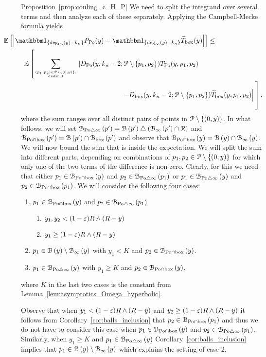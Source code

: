 \begin{proofof}{Proposition~\ref{prop:couling_c_H_P}}
We need to split the integrand over several terms and then analyze each of these separately. Applying the Campbell-Mecke formula yields
\begin{align*} 
 &\hspace{-30pt}\Exp{ \left| \ind{\mathrm{deg}_{\Po}(y) = k_n} P_{\Po}(y)
        - \ind{\mathrm{deg}_{\infty}(y) = k_n}  \widetilde{T}_{\mathrm{box}}(y)
        \right|}\leq \\
 & {\mathbb E} \left[ \sum_{(p_1,p_2) \in \Pcal \setminus \{(0,y)\}, \atop \text{distinct}}
  \left| D_{\Po}(y,k_n-2; \Pcal \setminus \{p_1,p_2 \}) T_{\Po}(y,p_1,p_2) \right. \right.\\
  & \hspace{5cm} 
\left. \left. - D_{\text{box}} (y,k_n-2;\Pcal \setminus \{p_1,p_2\}) \widetilde{T}_{\text{box}}(y,p_1,p_2)
   \right| \vphantom{\sum_{p_1,p_2 \in \Pcal \setminus \{(0,y)\}, \atop \text{distinct}}}\right],
\end{align*}
where the sum ranges over all distinct pairs of points in ${\mathcal P} \setminus \{ (0,y)\}$. In what follows, we will set ${\mathcal B}_{{\mathrm{Po}} \bigtriangleup \infty}\left(p'\right) = {\mathcal B}\left(p'\right) \bigtriangleup ({\mathcal B}_{\infty}\left(p'\right) \cap {\mathcal R})$ and ${\mathcal B}_{{\mathrm{Po}} \cap \text{box}}\left(p'\right) ={\mathcal B}\left(p'\right) \cap {\mathcal B}_{\text{box}}\left(p'\right)$ and observe that ${\mathcal B}_{{\mathrm{Po}} \cap \text{box}}\left(y\right) = {\mathcal B}\left(y\right) \cap {\mathcal B}_{\infty}\left(y\right)$. We will now bound the sum that is inside the expectation.
We will split the sum into different parts, depending on combinations of $p_1, p_2\in {\mathcal P} \setminus \{(0,y)\}$ for which only one of the two terms of the difference is non-zero. Clearly, for this we need that either $p_1 \in {\mathcal B}_{{\mathrm{Po}} \cap \text{box}}\left(y\right)$ and $p_2 \in {\mathcal B}_{{\mathrm{Po}} \bigtriangleup \infty}\left(p_1\right)$ or $p_1 \in {\mathcal B}_{{\mathrm{Po}} \bigtriangleup \infty}\left(y\right)$ and $p_2 \in {\mathcal B}_{{\mathrm{Po}} \cap \text{box}}\left(p_1\right)$. We will consider the following four cases:
\begin{enumerate}
\item$p_1 \in {\mathcal B}_{{\mathrm{Po}} \cap \text{box}}\left(y\right)$ and $p_2 \in {\mathcal B}_{{\mathrm{Po}} \bigtriangleup \infty}\left(p_1\right)$
\begin{enumerate}
\item $y_1,y_2 < (1-\varepsilon ) R \wedge (R-y)$
\item $y_1 \ge (1-\varepsilon ) R \wedge (R-y)$
\end{enumerate}
\item$p_1 \in {\mathcal B}\left(y\right) \setminus {\mathcal B}_{\infty}\left(y\right)$ with $y_1 < K$ and $p_2 \in {\mathcal B}_{{\mathrm{Po}} \cap \text{box}}\left(y\right)$.
\item $p_1 \in {\mathcal B}_{{\mathrm{Po}} \bigtriangleup \infty}\left(y\right)$ with $y_1 \ge K$ and $p_2 \in {\mathcal B}_{{\mathrm{Po}} \cap \text{box}}\left(y\right)$,
\end{enumerate}
where $K$ in the last two cases is the constant from Lemma~\ref{lem:asymptotics_Omega_hyperbolic}.

Observe that when $y_1 < (1-\varepsilon ) R \wedge (R-y)$ and $y_2 \ge (1-\varepsilon ) R \wedge (R-y)$ it follows from Corollary~\ref{cor:balls_inclusion} that $p_2 \in {\mathcal B}_{{\mathrm{Po}} \cap \text{box}}\left(p_1\right)$ and thus we do not have to consider this case when $p_1 \in {\mathcal B}_{{\mathrm{Po}} \cap \text{box}}\left(y\right)$ and $p_2 \in {\mathcal B}_{{\mathrm{Po}} \bigtriangleup \infty}\left(p_1\right)$. Similarly, when $y_1 \ge K$ and $p_1 \in {\mathcal B}_{{\mathrm{Po}} \bigtriangleup \infty}\left(y\right)$ Corollary~\ref{cor:balls_inclusion} implies that $p_1 \in {\mathcal B}\left(y\right) \setminus {\mathcal B}_{\infty}\left(y\right)$ which explains the setting of case 2.


\end{proofof}
